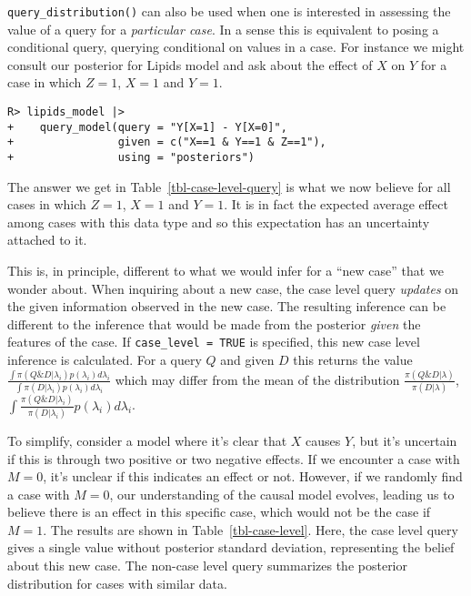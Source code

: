 \documentclass[
  11pt,
  article]{jss}
\begin{document}
\texttt{query\_distribution()} can also be used when one is interested
in assessing the value of a query for a \emph{particular case}. In a
sense this is equivalent to posing a conditional query, querying
conditional on values in a case. For instance we might consult our
posterior for Lipids model and ask about the effect of \(X\) on \(Y\)
for a case in which \(Z=1\), \(X=1\) and \(Y=1\).

\begin{verbatim}
R> lipids_model |>
+    query_model(query = "Y[X=1] - Y[X=0]",
+                given = c("X==1 & Y==1 & Z==1"),
+                using = "posteriors")
\end{verbatim}

\hypertarget{tbl-case-level-query}{}
\begin{table}[!h]
\caption{\label{tbl-case-level-query}Case level query example. }\tabularnewline

\centering
{}
\end{table}

The answer we get in Table~\ref{tbl-case-level-query} is what we now
believe for all cases in which \(Z=1\), \(X=1\) and \(Y=1\). It is in
fact the expected average effect among cases with this data type and so
this expectation has an uncertainty attached to it.

This is, in principle, different to what we would infer for a ``new
case'' that we wonder about. When inquiring about a new case, the case
level query \emph{updates} on the given information observed in the new
case. The resulting inference can be different to the inference that
would be made from the posterior \emph{given} the features of the case.
If \texttt{case\_level\ =\ TRUE} is specified, this new case level
inference is calculated. For a query \(Q\) and given \(D\) this returns
the value
\(\frac{\int\pi(Q \& D | \lambda_i)p(\lambda_i)d\lambda_i}{\int\pi(D | \lambda_i)p(\lambda_i)d\lambda_i}\)
which may differ from the mean of the distribution
\(\frac{\pi(Q \& D | \lambda)}{\pi(D | \lambda)}\),
\(\int \frac{\pi(Q \& D | \lambda_i)}{\pi(D | \lambda_i)} p(\lambda_i)d\lambda_i\).

To simplify, consider a model where it's clear that \(X\) causes \(Y\),
but it's uncertain if this is through two positive or two negative
effects. If we encounter a case with \(M=0\), it's unclear if this
indicates an effect or not. However, if we randomly find a case with
\(M=0\), our understanding of the causal model evolves, leading us to
believe there is an effect in this specific case, which would not be the
case if \(M=1\). The results are shown in Table~\ref{tbl-case-level}.
Here, the case level query gives a single value without posterior
standard deviation, representing the belief about this new case. The
non-case level query summarizes the posterior distribution for cases
with similar data.
\end{document}
